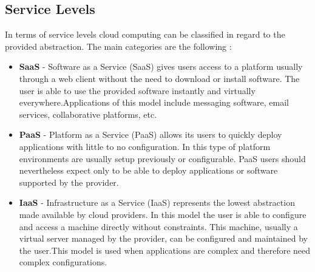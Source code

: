       \subsection{Service Levels} \label{chap:stateoftheheart:sec:cloud:sec:servicelevels}
  		In terms of service levels cloud computing can be classified in regard to the provided abstraction. The main categories are the following \cite{Vaquero2008} :
  		\begin{itemize}
  			\item \textbf{SaaS} - Software as a Service (SaaS) gives users access to a platform usually through a web client without the need to  download or install software. The user is able to use the provided software instantly and virtually everywhere.\linebreak Applications of this model include messaging software, email services, collaborative platforms, etc.
 				\item \textbf{PaaS} - Platform as a Service (PaaS) allows its users to quickly deploy applications with little to no configuration. In this type of platform environments are usually setup previously or configurable. PaaS users should nevertheless expect only to be able to deploy applications or software supported by the provider.
  			\item \textbf{IaaS} - Infrastructure as a Service (IaaS) represents the lowest abstraction made available by cloud providers. In this model the user is able to configure and access a machine directly without constraints. This machine, usually a virtual server managed by the provider, can be configured and maintained by the user.\linebreak This model is used when applications are complex and therefore need complex configurations.
  		\end{itemize}

